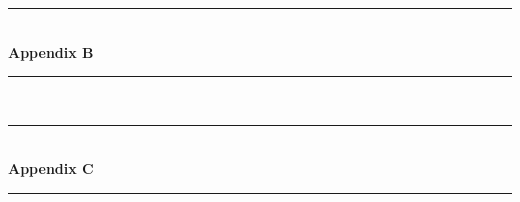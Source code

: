 \documentclass[a4paper]{IEEEtran}
\begin{document}
\begin{titlepage}
    \newcommand{\HRule}{\rule{\linewidth}{0.5mm}} %
    \center %
    \vspace*{3cm}
    \HRule \\[0.4cm]
    { \huge \bfseries Appendix B}\\[0.4cm] %
    \HRule \\[1.5cm]
\end{titlepage}

\clearpage

\begin{titlepage}
    \newcommand{\HRule}{\rule{\linewidth}{0.5mm}} %
    \center %
    \vspace*{3cm}
    \HRule \\[0.4cm]
    { \huge \bfseries Appendix C}\\[0.4cm] %
    \HRule \\[1.5cm]
\end{titlepage}

\end{document}
